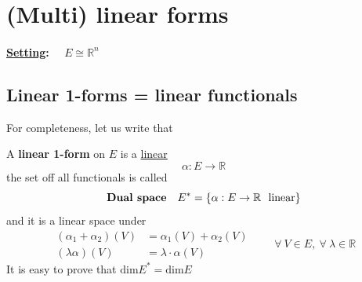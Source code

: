 \documentclass[../main.tex]{subfiles}
\begin{document}
\section{(Multi) linear forms}
\paragraph{\underline{Setting}: $\quad E\cong \mathbb{R}^n$}
\subsection{Linear 1-forms = linear functionals}
For completeness, let us write that
\begin{definition}
A \textbf{linear 1-form} on $E$ is a \underline{linear} 
\[
\alpha: E \to \mathbb{R}
\]
the set off all functionals is called 
\[
\textrm{\textbf{Dual space}} \quad E^\ast=\left\{\alpha: E\to\mathbb{R} \ \textrm{ linear} \right\}
\]
and it is a linear space under
\[
\begin{split}
    \left(\alpha_1+\alpha_2\right)(V) &=\alpha_1(V)+\alpha_2(V)\\
    \left(\lambda\alpha\right)(V) &= \lambda\cdot\alpha(V)
\end{split}
\qquad \forall \ V\in E, \ \forall \ \lambda\in\mathbb{R}
\]
It is easy to prove that \(\textrm{dim}E^\ast=\textrm{dim}E\)
\end{definition}
\end{document}
